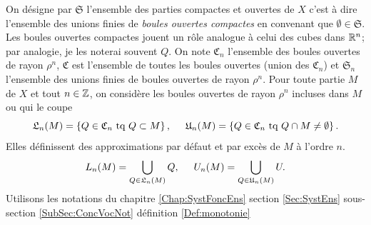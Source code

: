 On désigne par $\mathfrak{S}$ l'ensemble des parties compactes et ouvertes de $X$ c'est à dire l'ensemble des unions finies de \emph{boules ouvertes compactes} en convenant que $\emptyset \in \mathfrak{S}$. Les boules ouvertes compactes jouent un rôle analogue à celui des cubes dans $\mathbb{R}^n$; par analogie, je les noterai souvent $Q$.\newline
On note $\mathfrak{C}_n$ l'ensemble des boules ouvertes de rayon $\rho^n$, $\mathfrak{C}$ est l'ensemble de toutes les boules ouvertes (union des $\mathfrak{C}_n$) et $\mathfrak{S}_n$ l'ensemble des unions finies de boules ouvertes de rayon $\rho^n$.\newline
Pour toute partie $M$ de $X$ et tout $n\in \mathbb{Z}$, on considère les boules ouvertes de rayon $\rho^n$ incluses dans $M$ ou qui le coupe
\begin{displaymath}
 \mathfrak{L}_n(M) = \left\lbrace Q \in \mathfrak{C}_n \text{ tq } Q \subset M\right\rbrace, \hspace{0.5cm}
 \mathfrak{U}_n(M) = \left\lbrace Q \in \mathfrak{C}_n \text{ tq } Q \cap M \neq \emptyset \right\rbrace.
\end{displaymath}
Elles définissent des approximations par défaut et par excès de $M$ à l'ordre $n$.
\begin{displaymath}
 L_n(M) = \bigcup_{Q\in \mathfrak{L}_n(M)} Q, \hspace{0.5cm} U_n(M) = \bigcup_{Q\in \mathfrak{U}_n(M)} U.
\end{displaymath}
Utilisons les notations du chapitre \ref{Chap:SystFoncEns} section \ref{Sec:SystEns} sous-section \ref{SubSec:ConcVocNot} définition \ref{Def:monotonie}

